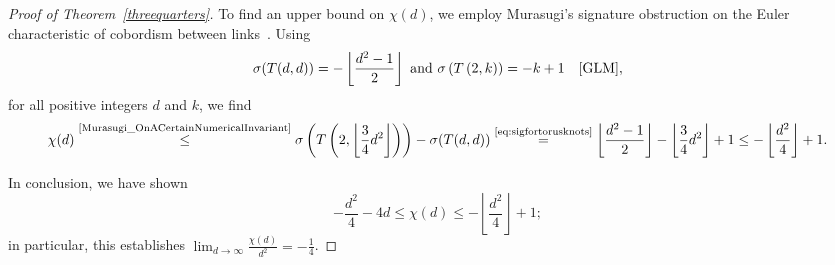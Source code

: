 \begin{proof}[Proof of Theorem~\ref{threequarters}]
To find an upper bound on $\chi(d)$, we employ Murasugi's signature obstruction on the Euler characteristic of cobordism between links~\cite{Murasugi_OnACertainNumericalInvariant}. Using
\begin{equation}\label{eq:sigfortorusknots}
\sigma(T(d,d))=-\left\lfloor\frac{d^2-1}{2}\right\rfloor\text{ and }\sigma\left(T\left(2,k\right)\right)=-k+1\quad\text{\cite[Theorem~5.2]{GLM}},
\end{equation}
for all positive integers $d$ and $k$, we find
\[
\chi(d)\overset{\text{\cite{Murasugi_OnACertainNumericalInvariant}}}{\leq}
\sigma\left(T\left(2,\left\lfloor\frac{3}{4}d^2\right\rfloor\right)\right)-\sigma(T(d,d))\overset{\text{\eqref{eq:sigfortorusknots}}}{=}\left\lfloor\frac{d^2-1}{2}\right\rfloor-\left\lfloor\frac{3}{4}d^2\right\rfloor+1\leq -\left\lfloor\frac{d^2}{4}\right\rfloor+1.
\]

In conclusion, we have shown
\begin{equation}\label{eq:boundsonchi(d)}
-\frac{d^2}{4}-4d\leq\chi(d)\leq-\left\lfloor\frac{d^2}{4}\right\rfloor+1;
\end{equation}
in particular, this establishes $\lim_{d \to \infty} \frac{\chi(d)}{d^2}=-\frac{1}{4}$.
\end{proof}

